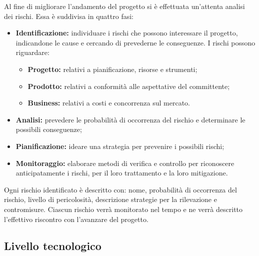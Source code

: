 Al fine di migliorare l'andamento del progetto si è effettuata un'attenta analisi dei rischi. Essa è suddivisa in quattro fasi:
\begin{itemize}
	\item \textbf{Identificazione:} individuare i rischi che possono interessare il progetto, indicandone le cause e cercando di prevederne
	le conseguenze. I rischi possono riguardare:
	\begin{itemize}
		\item \textbf{Progetto:} relativi a pianificazione, risorse e strumenti;
		\item \textbf{Prodotto:} relativi a conformità alle aspettative del committente;
		\item \textbf{\gls{Business}:} relativi a costi e concorrenza sul mercato.
	\end{itemize}
	\item \textbf{Analisi:} prevedere le probabilità di occorrenza del rischio e determinare le possibili conseguenze;
	\item \textbf{Pianificazione:} ideare una strategia per prevenire i possibili rischi;
	\item \textbf{Monitoraggio:} elaborare metodi di verifica e controllo per riconoscere anticipatamente i rischi, per il loro trattamento e la loro mitigazione.
\end{itemize}
Ogni rischio identificato è descritto con: nome, probabilità di occorrenza del rischio, livello di pericolosità, descrizione strategie per la rilevazione e contromisure. Ciascun rischio verrà monitorato nel tempo e ne verrà descritto l'effettivo riscontro con l'avanzare del progetto.

\subsection{Livello tecnologico}
